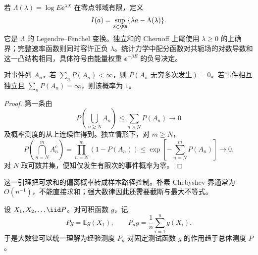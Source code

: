 \begin{definition}
若 $\Lambda(\lambda)=\log E\ee^{\lambda X}$ 在零点邻域有限，定义
\[
 I(a)=\sup_{\lambda\in\RR}\{\lambda a-\Lambda(\lambda)\}.
\]
它是 $\Lambda$ 的 Legendre--Fenchel 变换。独立和的 Chernoff 上尾使用 $\lambda\ge0$ 的上确界；完整速率函数则同时容许正负 $\lambda$。统计力学中配分函数对共轭场的对数导数和这一凸结构相同，具体符号由能量权重 $\ee^{-\beta E}$ 的负号决定。
\end{definition}

\begin{lemma}
对事件列 $A_n$，若 $\sum_nP(A_n)<\infty$，则 $P(A_n\text{ 无穷多次发生})=0$。若事件相互独立且 $\sum_nP(A_n)=\infty$，则该概率为 $1$。
\end{lemma}
\begin{proof}
第一条由
\[
 P\!\left(\bigcup_{n\ge N}A_n\right)\le\sum_{n\ge N}P(A_n)\longrightarrow0
\]
及概率测度的从上连续性得到。独立情形下，对 $m\ge N$，
\[
 P\!\left(\bigcap_{n=N}^m A_n^c\right)
 =\prod_{n=N}^m(1-P(A_n))
 \le\exp\!\left[-\sum_{n=N}^mP(A_n)\right]\longrightarrow0.
\]
对 $N$ 取可数并集，便知仅发生有限次的事件概率为零。
\end{proof}
这一引理把可求和的偏离概率转成样本路径控制。朴素 Chebyshev 界通常为 $O(n^{-1})$，不能直接求和；强大数律因此还需要截断与最大不等式。

设 $X_1,X_2,\ldots\iid P$。对可积函数 $g$，记
\[
 Pg=\mathbb E g(X_1),
 \qquad
 P_ng=\frac1n\sum_{i=1}^ng(X_i).
\]
于是大数律可以统一理解为经验测度 $P_n$ 对固定测试函数 $g$ 的作用趋于总体测度 $P$。

